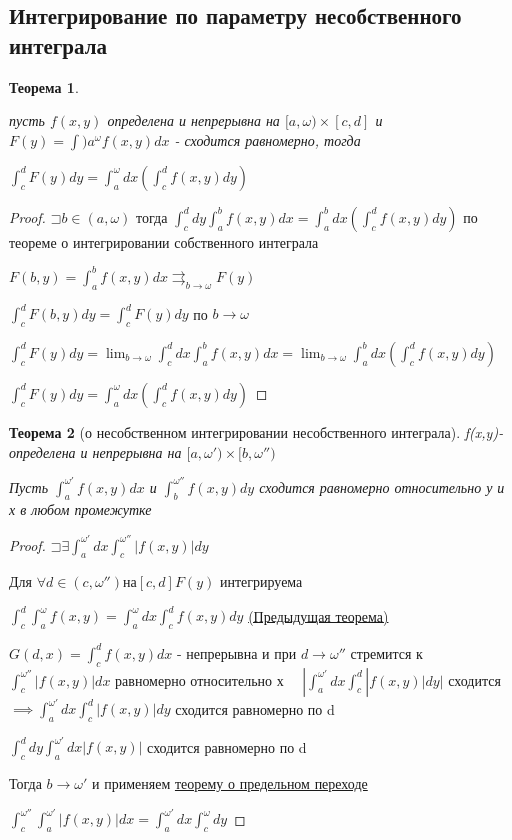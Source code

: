 \documentclass[a4paper]{article}
\newcommand\letsymbol{\mathord{\sqsupset}}
\newtheorem{theorem}{Теорема}[section]
\theoremstyle{definition}
\theoremstyle{remark}
\begin{document}
    \subsection{	Интегрирование по параметру несобственного интеграла}
    \begin{theorem} \hypertarget{p3}{}
     пусть $f(x,y)$ определена и непрерывна на $[a,\omega)\times[c,d]$ и $F(y)=\int)a^\omega f(x,y)dx$ - сходится равномерно, тогда

     $\int_c^d F(y)dy = \int_a^\omega dx(\int_c^d f(x,y)dy)$
\end{theorem}

\begin{proof}
     $\letsymbol{}b \in (a, \omega)$ тогда $\int_c^d dy \int_a^b f(x,y)dx = \int_a^b dx (\int_c^d f(x,y)dy)$
     по теореме о интегрировании собственного интеграла

     $F(b, y) = \int_a^b f(x,y)dx\rightrightarrows_{b\to\omega} F(y)$

     $\int_c^d F(b,y)dy = \int_c^d F(y)dy $ по $b\to\omega$

     $\int_c^d F(y)dy = \lim_{b\to\omega} \int_c^d dx\int_a^b f(x,y)dx = \lim_{b\to\omega}\int_a^b dx(\int_c^d f(x,y)dy)$

     $\int_c^d F(y)dy = \int_a^\omega dx (\int_c^d f(x,y)dy)$
\end{proof}

\begin{theorem}[о несобственном интегрировании несобственного интеграла]
     f(x,y)- определена и непрерывна на $[a,\omega')\times[b, \omega'')$

     Пусть $\int_a^{\omega'} f(x,y)dx$ и $\int_b^{\omega''} f(x,y)dy$ сходится равномерно относительно у и х в любом промежутке
\end{theorem}
\begin{proof}
     $\letsymbol{} \exists \int_a^{\omega'}dx\int_c^{\omega''}|f(x,y)|dy$

     Для $\forall d\in (c, \omega'') на [c,d] F(y)$ интегрируема

     $\int_c^d\int_a^\omega f(x,y) = \int_a^\omega dx \int_c^d f(x,y)dy$  \hyperlink{p3}{(Предыдущая теорема)}

     $G(d,x) = \int_c^d f(x,y)dx$ - непрерывна и при $d\to\omega''$ стремится к
     $\int_c^{\omega''}| f(x,y)|dx$ равномерно относительно х 
     $\quad|\int_a^{\omega'}dx \int_c^d|f(x,y)|dy|$ сходится $\implies \int_a^{\omega'}dx \int_c^d|f(x,y)|dy$ сходится равномерно по d

     $\int_c^d dy \int_a^{\omega'}dx |f(x,y)|$ сходится равномерно по d

     Тогда $b\to\omega' $ и применяем \hyperlink{p4}{теорему о предельном переходе}

     $\int_c^{\omega''}\int_a^{\omega'}|f(x,y)|dx = \int_a^{\omega'}dx\int_c^{\omega}dy$
\end{proof}
\end{document}

